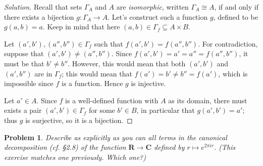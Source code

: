 \documentclass[fontsize=14pt]{scrartcl}
\newtheorem{problem-internal}{Problem}[subsection]
\newenvironment{problem}{
  \medskip
  \begin{problem-internal}
}{
  \end{problem-internal}
}
\newenvironment{solution}{
  \begin{proof}[Solution]
  \vspace{-8px}
  \setlength{\parskip}{4px}
  \setlength{\parindent}{0px}
}{
  \end{proof}
}
\begin{document}
\begin{solution}
Recall that sets $\Gamma_A$ and $A$ are \textit{isomorphic}, written
$\Gamma_A\cong A$, if and only if there exists a bijection $g:\Gamma_A\to A$.
Let's construct such a function $g$, defined to be $g(a,b) = a$. Keep in mind
that here $(a,b)\in\Gamma_f\subseteq A\times B$.

Let $(a',b'),(a'',b'')\in\Gamma_f$ such that $f(a',b') = f(a'',b'')$. For
contradiction, suppose that $(a',b')\neq (a'',b'')$. Since $f(a',b') = a' = a''
= f(a'',b'')$, it must be that $b'\neq b''$. However, this would mean that both
$(a',b')$ and $(a',b'')$ are in $\Gamma_f$; this would mean that $f(a') = b'
\neq b'' = f(a')$, which is impossible since $f$ is a function. Hence $g$ is
injective.

Let $a'\in A$. Since $f$ is a well-defined function with $A$ as its domain,
there must exists a pair $(a',b')\in\Gamma_f$ for some $b'\in B$, in particular
that $g(a',b') = a'$; thus $g$ is surjective, so it is a bijection.
\end{solution}


\begin{problem}
Describe as explicitly as you can all terms in the canonical decomposition (cf.
\S2.8) of the function $\mathbf{R}\to\mathbf{C}$ defined by $r\mapsto e^{2\pi
ir}$. (This exercise matches one previously. Which one?)
\end{problem}
\end{document}
